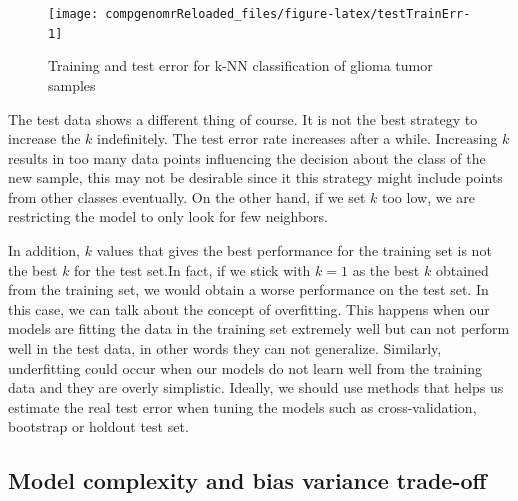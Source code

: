 \documentclass[12pt,]{krantz}
\begin{document}
\begin{figure}

{\centering \texttt{[image: compgenomrReloaded\_files/figure-latex/testTrainErr-1]} 

}

\caption{Training and test error for k-NN classification of glioma tumor samples}\label{fig:testTrainErr}
\end{figure}

The test data shows a different thing of course. It is not the best strategy to increase the \(k\) indefinitely. The test error rate increases after a while. Increasing \(k\) results in too many data points influencing the decision about the class of the new sample, this may not be desirable since it this strategy might include points from other classes eventually. On the other hand, if we set \(k\) too low, we are restricting the model to only look for few neighbors.

In addition, \(k\) values that gives the best performance for the training set is not the best \(k\) for the test set.In fact, if we stick with \(k=1\) as the best \(k\) obtained from the training set, we would obtain a worse performance on the test set. In this case, we can talk about the concept of overfitting. This happens when our models are fitting the data in the training set extremely well but can not perform well in the test data, in other words they can not generalize. Similarly, underfitting could occur when our models do not learn well from the training data and they are overly simplistic. Ideally, we should use methods that helps us estimate the real test error when tuning the models such as cross-validation, bootstrap or holdout test set.

\hypertarget{model-complexity-and-bias-variance-trade-off}{%
\subsection{Model complexity and bias variance trade-off}\label{model-complexity-and-bias-variance-trade-off}}
\end{document}
